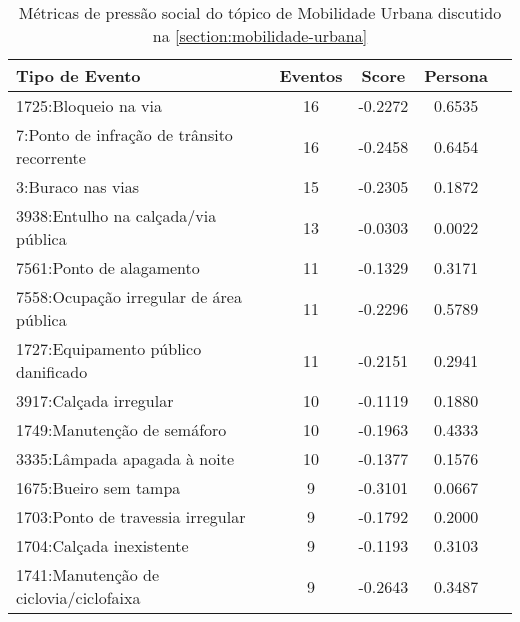 
\begin{table}[htbp]
	\centering
	\caption{Métricas de pressão social do tópico de Mobilidade Urbana discutido na \autoref{section:mobilidade-urbana}}
	\label{tab:eventos_populares_mobility}
	\begin{tabular}{|l|c|c|c|c|}
		\hline
		\textbf{Tipo de Evento}                         & \textbf{Eventos} & \textbf{Score} & \textbf{Persona} \\
		\hline
		1725:Bloqueio na via                            & 16               & -0.2272        & 0.6535           \\
		\hline
		7:Ponto de infração de trânsito recorrente      & 16               & -0.2458        & 0.6454           \\
		\hline
		3:Buraco nas vias                               & 15               & -0.2305        & 0.1872           \\
		\hline
		3938:Entulho na calçada/via pública             & 13               & -0.0303        & 0.0022           \\
		\hline
		7561:Ponto de alagamento                        & 11               & -0.1329        & 0.3171           \\
		\hline
		7558:Ocupação irregular de área pública         & 11               & -0.2296        & 0.5789           \\
		\hline
		1727:Equipamento público danificado             & 11               & -0.2151        & 0.2941           \\
		\hline
		3917:Calçada irregular                          & 10               & -0.1119        & 0.1880           \\
		\hline
		1749:Manutenção de semáforo                     & 10               & -0.1963        & 0.4333           \\
		\hline
		3335:Lâmpada apagada à noite                    & 10               & -0.1377        & 0.1576           \\
		\hline
		1675:Bueiro sem tampa                           & 9                & -0.3101        & 0.0667           \\
		\hline
		1703:Ponto de travessia irregular               & 9                & -0.1792        & 0.2000           \\
		\hline
		1704:Calçada inexistente                        & 9                & -0.1193        & 0.3103           \\
		\hline
		1741:Manutenção de ciclovia/ciclofaixa          & 9                & -0.2643        & 0.3487           \\

\end{tabular}
\end{table}
